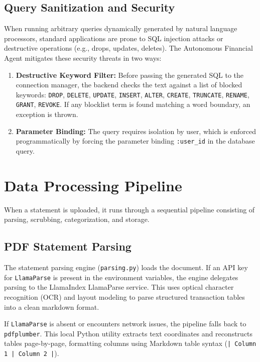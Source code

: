 \documentclass[11pt,a4paper]{article}
\begin{document}
\subsection{Query Sanitization and Security}
When running arbitrary queries dynamically generated by natural language processors, standard applications are prone to SQL injection attacks or destructive operations (e.g., drops, updates, deletes). The Autonomous Financial Agent mitigates these security threats in two ways:
\begin{enumerate}
    \item \textbf{Destructive Keyword Filter:} Before passing the generated SQL to the connection manager, the backend checks the text against a list of blocked keywords: \texttt{DROP}, \texttt{DELETE}, \texttt{UPDATE}, \texttt{INSERT}, \texttt{ALTER}, \texttt{CREATE}, \texttt{TRUNCATE}, \texttt{RENAME}, \texttt{GRANT}, \texttt{REVOKE}. If any blocklist term is found matching a word boundary, an exception is thrown.
    \item \textbf{Parameter Binding:} The query requires isolation by user, which is enforced programmatically by forcing the parameter binding \texttt{:user\_id} in the database query.
\end{enumerate}

\section{Data Processing Pipeline}
When a statement is uploaded, it runs through a sequential pipeline consisting of parsing, scrubbing, categorization, and storage.

\subsection{PDF Statement Parsing}
The statement parsing engine (\texttt{parsing.py}) loads the document. If an API key for \texttt{LlamaParse} is present in the environment variables, the engine delegates parsing to the LlamaIndex LlamaParse service. This uses optical character recognition (OCR) and layout modeling to parse structured transaction tables into a clean markdown format.

If \texttt{LlamaParse} is absent or encounters network issues, the pipeline falls back to \texttt{pdfplumber}. This local Python utility extracts text coordinates and reconstructs tables page-by-page, formatting columns using Markdown table syntax (\texttt{| Column 1 | Column 2 |}).
\end{document}
